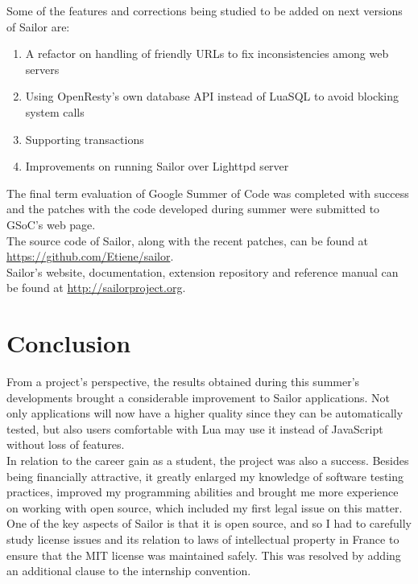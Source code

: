 \documentclass{article}
\begin{document}
Some of the features and corrections being studied to be added on next versions of Sailor are:\\

\begin{enumerate}\item A refactor on handling of friendly URLs to fix inconsistencies among web servers
\item Using OpenResty's own database API instead of LuaSQL to avoid blocking system calls
\item Supporting transactions
\item Improvements on running Sailor over Lighttpd server
\end{enumerate}

The final term evaluation of Google Summer of Code was completed with success and the patches with the code developed during summer were submitted to GSoC's web page.\\

The source code of Sailor, along with the recent patches, can be found at \url{https://github.com/Etiene/sailor}.\\

Sailor's website, documentation, extension repository and reference manual can be found at \url{http://sailorproject.org}.

\newpage

\section{Conclusion}

From a project's perspective, the results obtained during this summer's developments brought a considerable improvement to Sailor applications. Not only applications will now have a higher quality since they can be automatically tested, but also users comfortable with Lua may use it instead of JavaScript without loss of features.\\

In relation to the career gain as a student, the project was also a success. Besides being financially attractive, it greatly enlarged my knowledge of software testing practices, improved my programming abilities and brought me more experience on working with open source, which included my first legal issue on this matter. One of the key aspects of Sailor is that it is open source, and so I had to carefully study license issues and its relation to laws of intellectual property in France to ensure that the MIT license was maintained safely. This was resolved by adding an additional clause to the internship convention. \\
\end{document}
